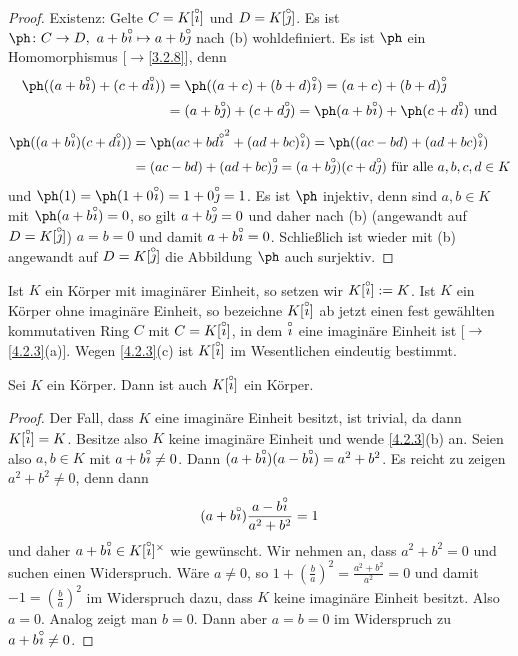 \documentclass[../../main.tex]{subfiles}
\begin{document}
\begin{proof}
Existenz: Gelte $C=K[\overset\circ\imath]$ und $D=K[\overset\circ\jmath]$. Es ist $\ph\colon C\to D,\ a+b\i\mapsto a+b\j$ nach (b) wohldefiniert. Es ist $\ph$ ein Homomorphismus [$\to$\ref{3.2.8}], denn
\begin{align*}
\ph((a+b\i)+(c+d\i))&=\ph((a+c)+(b+d)\i)=(a+c)+(b+d)\j\\
&=(a+b\j)+(c+d\j)=\ph(a+b\i)+\ph(c+d\i)\text{ und}
\end{align*}
\begin{align*}
\ph((a+b\i)(c+d\i))&=\ph(ac+bd\i^2+(ad+bc)\i)=\ph((ac-bd)+(ad+bc)\i)\\
&=(ac-bd)+(ad+bc)\j=(a+b\j)(c+d\j)\text{ für alle }a,b,c,d\in K
\end{align*}
und $\ph(1)=\ph(1+0\i)=1+0\j=1$. Es ist
$\ph$ injektiv, denn sind $a,b\in K$ mit $\ph(a+b\i)=0$, so gilt $a+b\overset\circ\jmath=0$ und daher nach (b) (angewandt auf $D=K[\overset\circ\jmath]$) $a=b=0$ und damit $a+b\overset\circ\imath=0$.
Schließlich ist wieder mit (b) angewandt auf $D=K[\overset\circ\jmath]$ die Abbildung $\ph$ auch surjektiv.
\end{proof}


\begin{nt}\label{4.2.4}
Ist $K$ ein Körper mit imaginärer Einheit, so setzen wir $K[\overset\circ\imath]:=K$. Ist $K$ ein Körper ohne imaginäre Einheit, so bezeichne $K[\overset\circ\imath]$ ab jetzt einen fest gewählten kommutativen Ring
$C$ mit $C=K[\overset\circ\imath]$, in dem $\overset\circ\imath$ eine imaginäre Einheit ist [$\to$\ref{4.2.3}(a)]. Wegen \ref{4.2.3}(c) ist $K[\overset\circ\imath]$ im Wesentlichen eindeutig bestimmt.
\end{nt}

\begin{sat}\label{4.2.5}
Sei $K$ ein Körper. Dann ist auch $K[\overset\circ\imath]$ ein Körper.
\end{sat}
\begin{proof}
Der Fall, dass $K$ eine imaginäre Einheit besitzt, ist trivial, da dann $K[\overset\circ\imath]=K$. Besitze also $K$ keine imaginäre Einheit und wende \ref{4.2.3}(b) an. Seien also
$a,b\in K$ mit $a+b\overset\circ\imath\ne0$. Dann $(a+b\overset\circ\imath)(a-b\overset\circ\imath)=a^2+b^2$. Es reicht zu zeigen $a^2+b^2\ne0$, denn dann
$$(a+b\overset\circ\imath)\frac{a-b\overset\circ\imath}{a^2+b^2}=1$$ und daher $a+b\overset\circ\imath\in K[\overset\circ\imath]^\times$ wie gewünscht. Wir nehmen an, dass $a^2+b^2=0$ und suchen einen Widerspruch.
Wäre $a\ne0$, so $1+(\frac ba)^2=\frac{a^2+b^2}{a^2}=0$ und damit $-1=(\frac ba)^2$ im Widerspruch dazu, dass $K$ keine imaginäre Einheit besitzt. Also $a=0$. Analog
zeigt man $b=0$. Dann aber $a=b=0$ im Widerspruch zu $a+b\overset\circ\imath\ne0$.
\end{proof}
\end{document}

